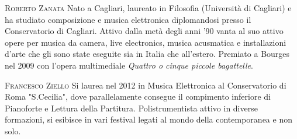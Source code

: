 \documentclass[9pt, twoside, a5paper]{extreport}
\newcommand{\biografia}[2]{%
\noindent \textsc{#1} %
#2 %
\medskip
}%
\begin{document}
\begin{multicols}{2}
\biografia{Roberto Zanata}{Nato a Cagliari, laureato in Filosofia (Università di Cagliari) e ha studiato composizione e musica elettronica diplomandosi presso il Conservatorio di Cagliari. Attivo dalla metà degli anni '90 vanta al suo attivo opere per musica da camera, live electronics, musica acusmatica e installazioni d'arte che gli sono state eseguite sia in Italia che all'estero. Premiato a Bourges nel 2009 con l'opera multimediale \textit{Quattro o cinque piccole bagattelle}.}

\biografia{Francesco Ziello}{Si laurea nel 2012 in Musica Elettronica al Conservatorio di Roma "S.Cecilia", dove parallelamente consegue il compimento inferiore di Pianoforte e Lettura della Partitura. Polistrumentista attivo in diverse formazioni, si esibisce in vari festival legati al mondo della contemporanea e non solo.}

\biografia{}{}

\biografia{}{}

\biografia{}{}

\biografia{}{}

\biografia{}{}


\end{multicols}

\clearpage

\section*{ }

	
\end{document}
